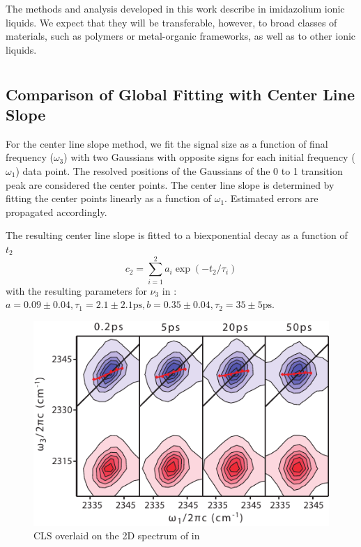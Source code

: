 \documentclass[%
  class = book,%
  crop = false,%
  float = true,%
  multi = true,%
  preview = false,%
]{standalone}
\begin{document}
{The methods and analysis developed in this work describe  in imidazolium ionic liquids. We expect that they will be transferable, however, to broad classes of materials, such as polymers or metal-organic frameworks, as well as to other ionic liquids.

\section{\texorpdfstring{}{Supporting Information}}
\label{paper_01:sec:SI}

\subsection{Comparison of Global Fitting with Center Line Slope}
\label{anionSI_CLS}

For the center line slope method, we fit the signal size as a function of final frequency (\(\omega_3\)) with two Gaussians with opposite signs for each initial frequency (\(\omega_1\)) data point. The resolved positions of the Gaussians of the 0 to 1 transition peak are considered the center points. The center line slope is determined by  fitting the center points linearly as a function of \(\omega_1\). Estimated errors are propagated accordingly.

The resulting center line slope is fitted to a biexponential decay as a function of \(t_2\)
\begin{equation}
c_2 = \sum_{i=1}^2 a_i \exp{\left( -t_2/\tau_i \right)}
\end{equation}
with the resulting parameters for  \(\nu_3\) in \ce{[Im_{4,1}][TFA]}: \(a = 0.09 \pm 0.04, \tau_1 = 2.1 \pm 2.1 \si{\ps}, b = 0.35 \pm 0.04, \tau_2 = 35 \pm 5 \si{\ps}\).

\begin{figure}[h]
  \centering
  \includegraphics[scale=0.8]{CLS_BMIMTFA.pdf}
  \caption[CLS overlaid on 2D-IR spectrum]{CLS overlaid on the 2D spectrum of  in \ce{[Im_{4,1}][TFA]}}
\end{figure}

}
\end{document}
